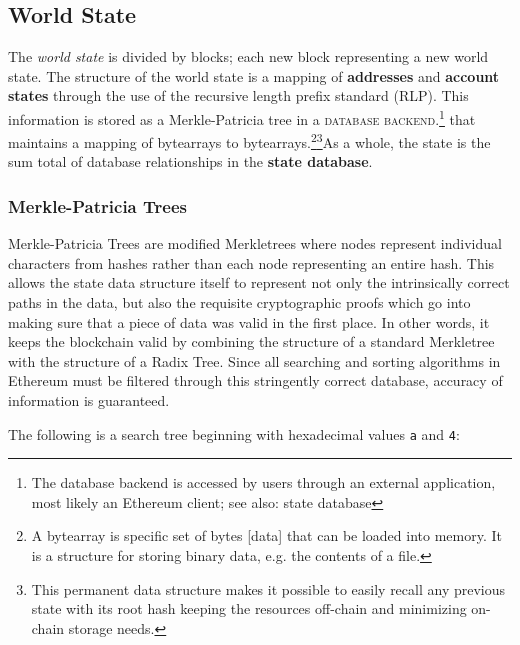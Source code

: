 \documentclass[10pt,a4paper,leqno,bibliography=totoc]{scrartcl}
\newenvironment{alphafootnotes}
{\par\edef\savedfootnotenumber{\number\value{footnote}}
\renewcommand{\thefootnote}{\alph{footnote}}
\setcounter{footnote}{0}}
{\par\setcounter{footnote}{\savedfootnotenumber}}
\begin{document}
\begin{alphafootnotes}
\begin{multicols*}{2}
			\subsection{World State}
				The \textit{world state} is divided by blocks; each new block representing a new world state. The structure of the world state is a mapping of \textbf{addresses} and \textbf{\gls{account state}s} through the use of the recursive length prefix standard (RLP). This information is stored as a  Merkle-Patricia tree in a \textsc{database backend}.\footnote{The database backend is accessed by users through an external application, most likely an Ethereum client; see also: \gls{state database}} that maintains a mapping of bytearrays to bytearrays.\footnote{A bytearray is specific set of bytes [data] that can be loaded into memory. It is a structure for storing binary data, e.g. the contents of a file.}\footnote{This permanent data structure makes it possible to easily recall any previous state with its root hash keeping the resources off-chain and minimizing on-chain storage needs.}As a whole, the state is the sum total of database relationships in the \textbf{ \gls{state database}}. 
			
			\subsubsection{Merkle-Patricia Trees} 
	
				
	Merkle-Patricia Trees are modified Merkletrees where nodes represent individual characters from hashes rather than each node representing an entire hash. This allows the state data structure itself to represent not only the intrinsically correct paths in the data, but also the requisite cryptographic proofs which go into making sure that a piece of data was valid in the first place. In other words, it keeps the blockchain valid by combining the structure of a standard Merkletree with the structure of a Radix Tree. Since all searching and sorting algorithms in Ethereum must be filtered through this stringently correct database, accuracy of information is guaranteed. \par		
		
		The following is a search tree beginning with hexadecimal values \texttt{a} and \texttt{4}: \\
		

\end{multicols*}
\end{alphafootnotes}
\end{document}
